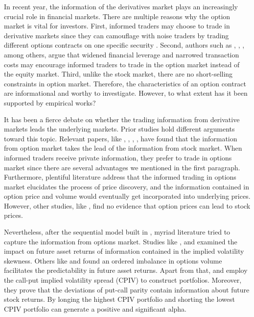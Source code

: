 
In recent year, the information of the derivatives market plays an increasingly crucial role in financial markets. There are multiple reasons why the option market is vital for investors. First, informed traders may choose to trade in derivative markets since they can camouflage with noise traders by trading different options contracts on one specific security \parencite{easley1998option}. Second, authors such as \textcite{black1973pricing}, \textcite{mayhew1995allocation}, \textcite{fleming1996trading}, among others, argue that widened financial leverage and narrowed transaction costs may encourage informed traders to trade in the option market instead of the equity market. Third, unlike the stock market, there are no short-selling constraints in option market. Therefore, the characteristics of an option contract are informational and worthy to investigate. However, to what extent has it been supported by empirical works? 

It has been a fierce debate on whether the trading information from derivative markets leads the underlying markets. Prior studies hold different arguments toward this topic. Relevant papers, like \textcite{manaster1982option}, \textcite{anthony1988interrelation}, \textcite{chakravarty2004informed}, \textcite{cremers2010deviations}, \textcite{xing2010does} have found that the information from option market takes the lead of the information from stock market. When informed traders receive private information, they prefer to trade in options market since there are several advantages we mentioned in the first paragraph. Furthermore, plentiful literature address that the informed trading in options market elucidates the process of price discovery, and the information contained in option price and volume would eventually get incorporated into underlying prices. However, other studies, like \textcite{chan1993option}, \textcite{stephan1990intraday} find no evidence that option prices can lead to stock prices. 

Nevertheless, after the sequential model built in \textcite{easley1998option}, myriad literature tried to capture the information from options market. Studies like \textcite{doran2007there}, \textcite{doran2010implications} and \textcite{atilgan2015implied} examined the impact on future asset returns of information contained in the implied volatility skewness. Others like \textcite{chan2002informational} and \textcite{pan2006information} found an ordered imbalance in options volume facilitates the predictability in future asset returns. Apart from that, \textcite{bali2009volatility} and \textcite{cremers2010deviations} employ the call-put implied volatility spread (CPIV) to construct portfolios. Moreover, they prove that the deviations of put-call parity contain information about future stock returns. By longing the highest CPIV portfolio and shorting the lowest CPIV portfolio can generate a positive and significant alpha.   


